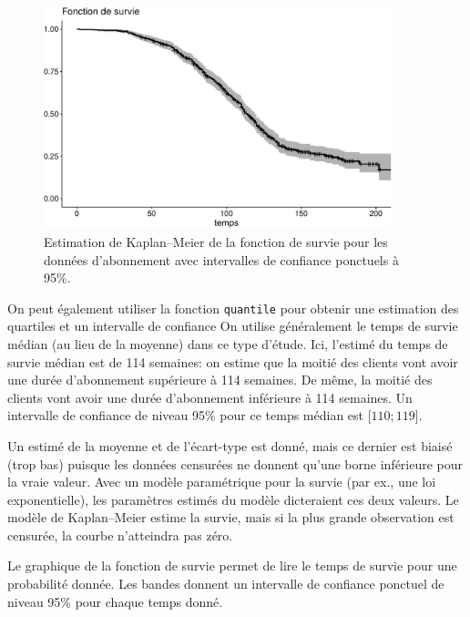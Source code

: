 \documentclass[
  11pt,
  letterpaper,
]{scrbook}
\theoremstyle{definition}
\theoremstyle{remark}
\begin{document}
\begin{figure}[ht!]

{\centering \includegraphics[width=0.9\textwidth,height=\textheight]{./06-survie_files/figure-pdf/fig-km-survie1-1.pdf}

}

\caption{\label{fig-km-survie1}Estimation de Kaplan--Meier de la
fonction de survie pour les données d'abonnement avec intervalles de
confiance ponctuels à 95\%.}

\end{figure}

On peut également utiliser la fonction \texttt{quantile} pour obtenir
une estimation des quartiles et un intervalle de confiance On utilise
généralement le temps de survie médian (au lieu de la moyenne) dans ce
type d'étude. Ici, l'estimé du temps de survie médian est de 114
semaines: on estime que la moitié des clients vont avoir une durée
d'abonnement supérieure à 114 semaines. De même, la moitié des clients
vont avoir une durée d'abonnement inférieure à 114 semaines. Un
intervalle de confiance de niveau 95\% pour ce temps médian est
{[}\(110; 119\){]}.

Un estimé de la moyenne et de l'écart-type est donné, mais ce dernier
est biaisé (trop bas) puisque les données censurées ne donnent qu'une
borne inférieure pour la vraie valeur. Avec un modèle paramétrique pour
la survie (par ex., une loi exponentielle), les paramètres estimés du
modèle dicteraient ces deux valeurs. Le modèle de Kaplan--Meier estime
la survie, mais si la plus grande observation est censurée, la courbe
n'atteindra pas zéro.

Le graphique de la fonction de survie permet de lire le temps de survie
pour une probabilité donnée. Les bandes donnent un intervalle de
confiance ponctuel de niveau 95\% pour chaque temps donné.
\end{document}
